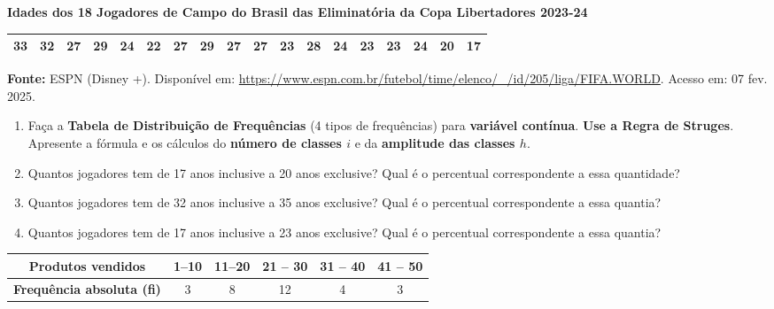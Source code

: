 \documentclass{jhwhw}
\begin{document}
\newpage

\newpage
{}
\begin{center}
	\textbf{Idades dos 18 Jogadores de Campo do Brasil das Eliminatória da Copa Libertadores 2023-24}
	\begin{tabular}{llllllllllllllllll}
		\hline 33 & 32 & 27 & 29 & 24 & 22 & 27 & 29 & 27 & 27 & 23 & 28 & 24 & 23 & 23 & 24 & 20 & 17 \\
		\hline
	\end{tabular}
	\textbf{Fonte:} ESPN (Disney +). Disponível em: \url{https://www.espn.com.br/futebol/time/elenco/\_/id/205/liga/FIFA.WORLD}. Acesso em: 07 fev. 2025.
\end{center}
\begin{enumerate}[label=\alph*)]
	\item Faça a \textbf{Tabela de Distribuição de Frequências} (4 tipos de frequências) para \textbf{variável contínua}. \textbf{Use a Regra de Struges}. Apresente a fórmula e os cálculos do \textbf{número de classes $i$} e da \textbf{amplitude das classes $h$}.
	\item Quantos jogadores tem de 17 anos inclusive a 20 anos exclusive? Qual é o percentual correspondente a essa quantidade?
	\item Quantos jogadores tem de 32 anos inclusive a 35 anos exclusive? Qual é o percentual correspondente a essa quantia?
	\item Quantos jogadores tem de 17 anos inclusive a 23 anos exclusive? Qual é o percentual correspondente a essa quantia?
\end{enumerate}

\newpage

\newpage
{}
\begin{table}
	\begin{center}
		\begin{tabular}{| c | c | c | c | c | c |}
			\hline
			\textbf{Produtos vendidos}        & 1--10 & 11--20 & 21 -- 30 & 31 -- 40 & 41 -- 50 \\
			\hline
			\textbf{Frequência absoluta (fi)} & 3     & 8      & 12       & 4        & 3        \\
			\hline
		\end{tabular}
	\end{center}
\end{table}
\end{document}
